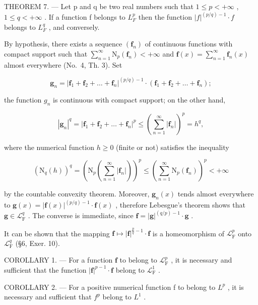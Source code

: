 THEOREM 7. --- Let p and q be two real numbers such that \(1 \leqslant p < +\infty\) , \(1 \leqslant q < +\infty\) . If a function f belongs to \(L_{F}^{p}\) then the function \(|f|^{(p/q)-1} \cdot f\) belongs to \(L_{F}^{q}\) , and conversely.

By hypothesis, there exists a sequence \((\mathbf{f}_{n})\) of continuous functions with compact support such that \(\sum_{n=1}^{\infty}\mathrm{N}_{p}(\mathbf{f}_{n})<+\infty\) and \(\mathbf{f}(x)=\sum_{n=1}^{\infty}\mathbf{f}_{n}(x)\) almost everywhere (No.~4, Th. 3). Set

\[
\mathbf {g} _ {n} = | \mathbf {f} _ {1} + \mathbf {f} _ {2} + \dots + \mathbf {f} _ {n} | ^ {(p / q) - 1} \cdot (\mathbf {f} _ {1} + \mathbf {f} _ {2} + \dots + \mathbf {f} _ {n});
\]

the function \(g_{n}\) is continuous with compact support; on the other hand,

\[
\left| \mathbf {g} _ {n} \right| ^ {q} = \left| \mathbf {f} _ {1} + \mathbf {f} _ {2} + \dots + \mathbf {f} _ {n} \right| ^ {p} \leqslant \left(\sum_ {n = 1} ^ {\infty} \left| \mathbf {f} _ {n} \right|\right) ^ {p} = h ^ {q},
\]

where the numerical function \(h \geqslant 0\) (finite or not) satisfies the inequality

\[
\left(\mathrm{N} _ {q} (h)\right) ^ {q} = \left(\mathrm{N} _ {p} \left(\sum_ {n = 1} ^ {\infty} | \mathbf {f} _ {n} |\right)\right) ^ {p} \leqslant \left(\sum_ {n = 1} ^ {\infty} \mathrm{N} _ {p} (\mathbf {f} _ {n})\right) ^ {p} <   + \infty
\]

by the countable convexity theorem. Moreover, \(\mathbf{g}_n(x)\) tends almost everywhere to \(\mathbf{g}(x) = |\mathbf{f}(x)|^{(p/q)-1} \cdot \mathbf{f}(x)\) , therefore Lebesgue's theorem shows that \(\mathbf{g} \in \mathcal{L}_{\mathrm{F}}^q\) . The converse is immediate, since \(\mathbf{f} = |\mathbf{g}|^{(q/p)-1} \cdot \mathbf{g}\) .

It can be shown that the mapping \(\mathbf{f} \mapsto |\mathbf{f}|^{\frac{p}{q}-1} \cdot \mathbf{f}\) is a homeomorphism of \(\mathcal{L}_{\mathrm{F}}^{p}\) onto \(\mathcal{L}_{\mathrm{F}}^{q}\) (§6, Exer. 10).

COROLLARY 1. --- For a function \(\mathbf{f}\) to belong to \(\mathcal{L}_{\mathrm{F}}^{p}\) , it is necessary and sufficient that the function \(|\mathbf{f}|^{p-1} \cdot \mathbf{f}\) belong to \(\mathcal{L}_{\mathrm{F}}^{1}\) .

COROLLARY 2. --- For a positive numerical function f to belong to \(L^{p}\) , it is necessary and sufficient that \(f^{p}\) belong to \(L^{1}\) .

